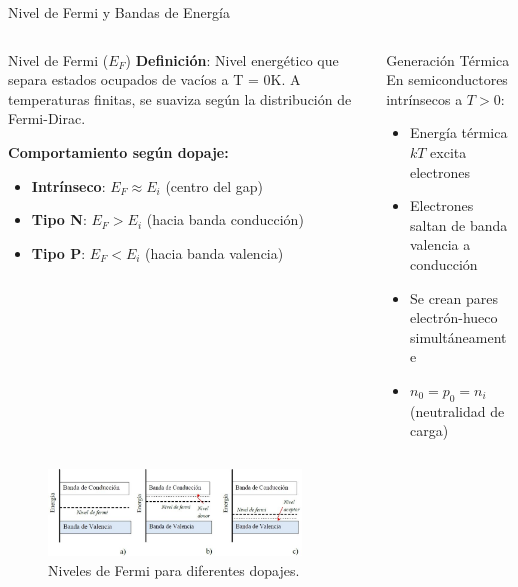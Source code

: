 \documentclass[
    10pt,
    aspectratio=169,
    xcolor={dvipsnames},
    spanish,
    ]{beamer}
\begin{document}
\begin{frame}{Nivel de Fermi y Bandas de Energía}
\begin{columns}
  \begin{column}{0.55\textwidth}
    \begin{block}{Nivel de Fermi ($E_F$)}
      \scriptsize
      \textbf{Definición}: Nivel energético que separa estados ocupados de vacíos a T = 0K. A temperaturas finitas, se suaviza según la distribución de Fermi-Dirac.

      \vspace{0.3cm}
      \textbf{Comportamiento según dopaje:}
      \begin{itemize}
        \item \textbf{Intrínseco}: $E_F \approx E_i$ (centro del gap)
        \item \textbf{Tipo N}: $E_F > E_i$ (hacia banda conducción)
        \item \textbf{Tipo P}: $E_F < E_i$ (hacia banda valencia)
      \end{itemize}
    \end{block}
  \end{column}
  
  \begin{column}{0.43\textwidth}
    \begin{block}{Generación Térmica}
      \scriptsize
      En semiconductores intrínsecos a $T > 0$:
      \begin{itemize}
        \item Energía térmica $kT$ excita electrones
        \item Electrones saltan de banda valencia a conducción
        \item Se crean pares electrón-hueco simultáneamente
        \item $n_0 = p_0 = n_i$ (neutralidad de carga)
      \end{itemize}
    \end{block}
  \end{column}
\end{columns}
  \begin{figure}[H]
    \centering
    \includegraphics[width=0.6\textwidth]{../figures/Auxiliar_2_5.jpg}
    \caption{Niveles de Fermi para diferentes dopajes.}
  \label{fig:bandas_polarizacion}
\end{figure}
\end{frame}
\end{document}
